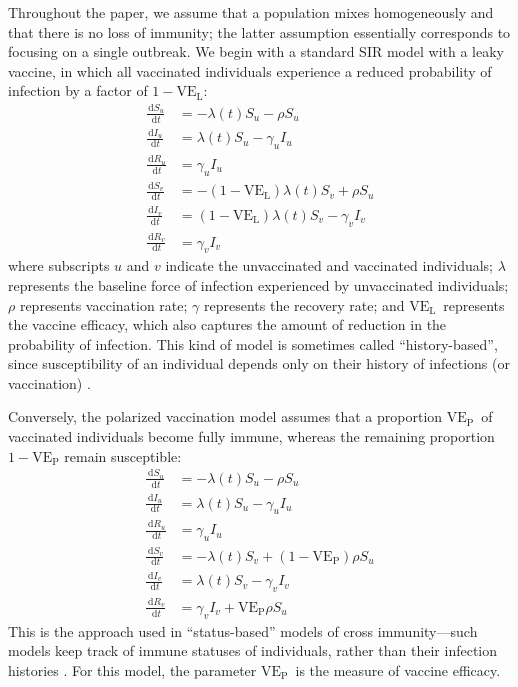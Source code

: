 \documentclass[12pt]{article}
\newcommand{\dd}[1]{\ensuremath{\, \mathrm{d}#1}}
\newcommand{\VE}{\ensuremath{\mathrm{VE}}}
\newcommand{\VEP}{\ensuremath{\VE_{\mathrm{P}}}}
\newcommand{\VEL}{\ensuremath{\VE_{\mathrm{L}}}}
\begin{document}
Throughout the paper, we assume that a population mixes homogeneously and that there is no loss of immunity;
the latter assumption essentially corresponds to focusing on a single outbreak.
We begin with a standard SIR model with a leaky vaccine, in which all vaccinated individuals experience a reduced probability of infection by a factor of $1-\VEL$:
\begin{align}
\frac{\dd S_u}{\dd t} &= - \lambda(t) S_u - \rho S_u \\
\frac{\dd I_u}{\dd t} &= \lambda(t) S_u - \gamma_u I_u \\
\frac{\dd R_u}{\dd t} &= \gamma_u I_u \\
\frac{\dd S_v}{\dd t} &= - (1-\VEL) \lambda(t) S_v + \rho S_u \\
\frac{\dd I_v}{\dd t} &= (1-\VEL) \lambda(t) S_v - \gamma_v I_v \\
\frac{\dd R_v}{\dd t} &= \gamma_v I_v
\end{align}
where subscripts $u$ and $v$ indicate the unvaccinated and vaccinated individuals;
$\lambda$ represents the baseline force of infection experienced by unvaccinated individuals; 
$\rho$ represents vaccination rate;
$\gamma$ represents the recovery rate;
and \VEL\ represents the vaccine efficacy, which also captures the amount of reduction in the probability of infection.
This kind of model is sometimes called “history-based”, since susceptibility of an individual depends only on their history of infections (or vaccination) \citep{gog2002dynamics,gog2002status,kucharski2016capturing}.

Conversely, the polarized vaccination model assumes that a proportion \VEP\ of vaccinated individuals become fully immune, whereas the remaining proportion $1-\VEP$ remain susceptible: 
\begin{align}
\frac{\dd S_u}{\dd t} &= - \lambda(t) S_u - \rho S_u \\
\frac{\dd I_u}{\dd t} &= \lambda(t) S_u - \gamma_u I_u \\
\frac{\dd R_u}{\dd t} &= \gamma_u I_u \\
\frac{\dd S_v}{\dd t} &= - \lambda(t) S_v + (1-\VEP) \rho S_u \\
\frac{\dd I_v}{\dd t} &= \lambda(t) S_v - \gamma_v I_v \\
\frac{\dd R_v}{\dd t} &= \gamma_v I_v + \VEP \rho S_u
\end{align}
This is the approach used in “status-based” models of cross immunity---such models keep track of immune statuses of individuals, rather than their infection histories \citep{gog2002dynamics,gog2002status,kucharski2016capturing}.
For this model, the parameter \VEP\ is the measure of vaccine efficacy.
\end{document}
